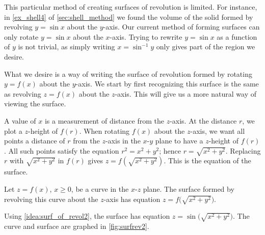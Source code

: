 This particular method of creating surfaces of revolution is limited. For instance, in \autoref{ex_shell4} of \autoref{sec:shell_method} we found the volume  of the solid formed by revolving $y=\sin x$ about the $y$-axis. Our current method of forming surfaces can only rotate $y=\sin x$ about the $x$-axis. Trying to rewrite $y=\sin x$ as a function of $y$ is not trivial, as simply writing $x=\sin^{-1}y$ only gives part of the region we desire.

What we desire is a way of writing the surface of revolution formed by rotating $y=f(x)$ about the $y$-axis. We start by first recognizing this surface is the same as revolving $z=f(x)$ about the $z$-axis. This will give us a more natural way of viewing the surface. 

A value of $x$ is a measurement of distance from the $z$-axis. At the distance $r$, we plot a $z$-height of $f(r)$. When rotating $f(x)$ about the $z$-axis, we want all points a distance of $r$ from the $z$-axis in the $x$-$y$ plane to have a $z$-height of $f(r)$. All such points satisfy the equation $r^2=x^2+y^2$; hence $r=\sqrt{x^2+y^2}$. Replacing $r$ with $\sqrt{x^2+y^2}$ in $f(r)$ gives $z=f(\sqrt{x^2+y^2})$. This is the equation of the surface.

{Let $z=f(x)$, $x\geq 0$, be a curve in the $x$-$z$ plane. The surface formed by revolving this curve about the $z$-axis has equation $z=f\big(\sqrt{x^2+y^2}\big)$.}


{Using \autoref{idea:surf_of_revol2}, the surface has equation $z=\sin\big(\sqrt{x^2+y^2}\big)$. The curve and surface are graphed in \autoref{fig:surfrev2}.}

